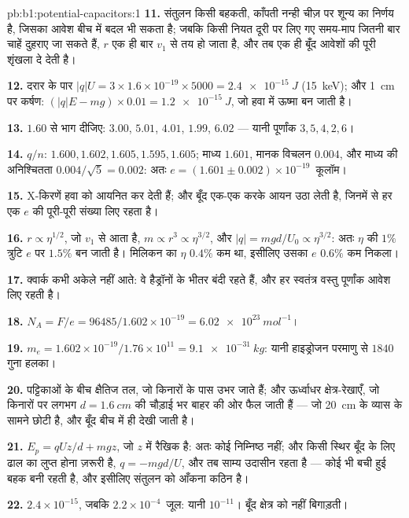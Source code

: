 \begin{solution}{pb:b1:potential-capacitors:1}
\textbf{11.} संतुलन किसी बहकती, काँपती नन्ही चीज़ पर शून्य का निर्णय है,
जिसका आवेश बीच में बदल भी सकता है; जबकि किसी नियत दूरी पर लिए गए समय-माप
जितनी बार चाहें दुहराए जा सकते हैं, $r$ एक ही बार $v_1$ से तय हो जाता है,
और तब एक ही बूँद आवेशों की पूरी शृंखला दे देती है।

\textbf{12.} दरार के पार $|q|U = 3 \times 1.6 \times 10^{-19} \times 5000 = \qty{2.4e-15}{J}$
(\qty{15}{keV}); और \qty{1}{cm} पर कर्षण: $(|q|E - mg) \times 0.01 =
\qty{1.2e-15}{J}$, जो हवा में ऊष्मा बन जाती है।

\textbf{13.} $1.60$ से भाग दीजिए: $3.00$, $5.01$, $4.01$, $1.99$, $6.02$ ---
यानी पूर्णांक $3, 5, 4, 2, 6$।

\textbf{14.} $q/n$: $1.600, 1.602, 1.605, 1.595, 1.605$; माध्य $1.601$,
मानक विचलन $0.004$, और माध्य की अनिश्चितता $0.004/\sqrt5 =
0.002$: अतः $e = (1.601 \pm 0.002) \times 10^{-19}$~कूलॉम।

\textbf{15.} X-किरणें हवा को आयनित कर देती हैं; और बूँद एक-एक करके आयन उठा
लेती है, जिनमें से हर एक $e$ की पूरी-पूरी संख्या लिए रहता है।

\textbf{16.} $r \propto \eta^{1/2}$, जो $v_1$ से आता है, $m \propto r^3 \propto \eta^{3/2}$, और
$|q| = mgd/U_0 \propto \eta^{3/2}$: अतः $\eta$ की $1\%$ त्रुटि $e$ पर
$1.5\%$ बन जाती है।
मिलिकन का $\eta$ $0.4\%$ कम था, इसीलिए उसका $e$ $0.6\%$ कम निकला।

\textbf{17.} क्वार्क कभी अकेले नहीं आते: वे हैड्रॉनों के भीतर बंदी रहते
हैं, और हर स्वतंत्र वस्तु पूर्णांक आवेश लिए रहती है।

\textbf{18.} $N_A = F/e = 96485/1.602 \times 10^{-19} = \qty{6.02e23}{mol^{-1}}$।

\textbf{19.} $m_e = 1.602 \times 10^{-19}/1.76 \times 10^{11} = \qty{9.1e-31}{kg}$: यानी
हाइड्रोजन परमाणु से $1840$ गुना हलका।

\textbf{20.} पट्टिकाओं के बीच क्षैतिज तल, जो किनारों के पास उभर जाते हैं;
और ऊर्ध्वाधर क्षेत्र-रेखाएँ, जो किनारों पर लगभग $d = \qty{1.6}{cm}$ की
चौड़ाई भर बाहर की ओर फैल जाती हैं --- जो \qty{20}{cm} के व्यास के सामने
छोटी है, और बूँद बीच में ही देखी जाती है।

\textbf{21.} $E_p = qUz/d + mgz$, जो $z$ में रैखिक है: अतः कोई निम्निष्ठ
नहीं; और किसी स्थिर बूँद के लिए ढाल का लुप्त होना ज़रूरी है, $q = -mgd/U$,
और तब साम्य उदासीन रहता है --- कोई भी बची हुई बहक बनी रहती है, और इसीलिए
संतुलन को आँकना कठिन है।

\textbf{22.} $2.4 \times 10^{-15}$, जबकि $2.2 \times 10^{-4}$~जूल: यानी $10^{-11}$।
बूँद क्षेत्र को नहीं बिगाड़ती।


\end{solution}
